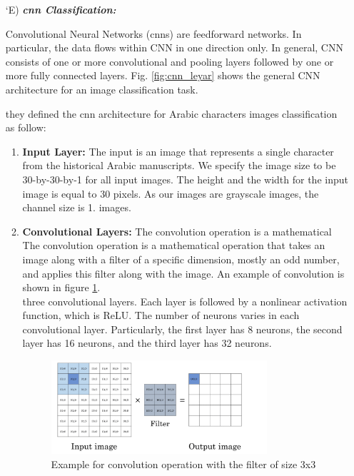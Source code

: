 \begin{itemize}[labelindent=1em,labelsep=0.25cm,leftmargin=*]
        
        \item[\char `E)] \textit{\textbf{\acrshort{cnn} Classification:}}
        
        Convolutional Neural Networks (\acrshort{cnn}s) are feedforward networks. In particular, the data flows within CNN in one direction only. In general, CNN consists of one or more convolutional and pooling layers followed by one or more fully connected layers. Fig. \ref{fig:cnn_leyar} shows the general CNN architecture for an image classification task.
        
        they defined the \acrshort{cnn} architecture for Arabic characters images classification as follow:
        \begin{enumerate}
        \item {\textbf{Input Layer:}}
       The input is an image that represents a single character from the historical Arabic manuscripts. We specify the image size to be 30-by-30-by-1 for all input images. The height and the width for the input image is equal to 30 pixels. As our images are grayscale images, the channel size is 1. images.
       
        \item {\textbf{Convolutional Layers:}}
        The convolution operation is a mathematical The convolution operation is a mathematical operation that takes an image along with a filter of a specific dimension, mostly an odd number, and applies this filter along with the image. An example of convolution is shown in figure \ref{fig:cnn-onvolution}. \\
        
        three convolutional layers. Each layer is followed by a
        nonlinear activation function, which is ReLU. The number of neurons varies in each convolutional layer. Particularly, the first layer has 8 neurons, the second layer has 16 neurons, and the third layer has 32 neurons.
        
        \begin{figure}[!htb]
        \centering
        \includegraphics[width=8cm]{images/cnn-convolution.png}
        \caption{Example for convolution operation with the filter of size 3x3}
        \label{fig:cnn-onvolution}
        \end{figure}
        

\end{enumerate}
\end{itemize}
